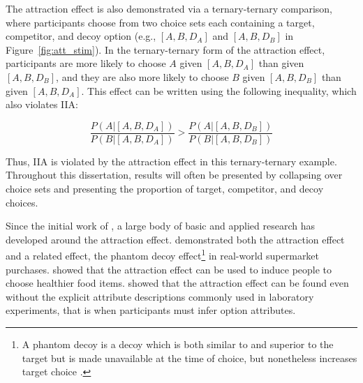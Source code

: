 The attraction effect is also demonstrated via a ternary-ternary comparison, where participants choose from two choice sets each containing a target, competitor, and decoy option (e.g., $[A,B,D_{A}]$ and  $[A,B,D_{B}]$ in Figure~\ref{fig:att_stim}). In the ternary-ternary form of the attraction effect, participants are more likely to choose $A$ given $[A,B,D_{A}]$ than given $[A,B,D_{B}]$, and they are also more likely to choose $B$ given $[A,B,D_{B}]$ than given $[A,B,D_{A}]$. This effect can be written using the following inequality, which also violates IIA:

\begin{equation}
  \frac{P(A|[A,B,D_{A}])}{P(B|[A,B,D_{A}])}>\frac{P(A|[A,B,D_{B}])}{P(B|[A,B,D_{B}])}
  \label{eqn:iia_att2}
\end{equation}

Thus, IIA is violated by the attraction effect in this ternary-ternary example. Throughout this dissertation, results will often be presented by collapsing over choice sets and presenting the proportion of target, competitor, and decoy choices.

Since the initial work of \textcite{huberAddingAsymmetricallyDominated1982d}, a large body of basic and applied research has developed around the attraction effect. \textcite{doyleRobustnessAsymmetricallyDominated1999} demonstrated both the attraction effect and a related effect, the phantom decoy effect\footnote{A phantom decoy is a decoy which is both similar to and superior to the target but is made unavailable at the time of choice, but nonetheless increases target choice \parencite{pratkanisBriefHistoryResearch1992b}.} in real-world supermarket purchases.\textcite{van2021attract} showed that the attraction effect can be used to induce people to choose healthier food items. \textcite{slaughterDecoyEffectsAttributelevel1999b} showed that the attraction effect can be found even without the explicit attribute descriptions commonly used in laboratory experiments, that is when participants must infer option attributes. 

